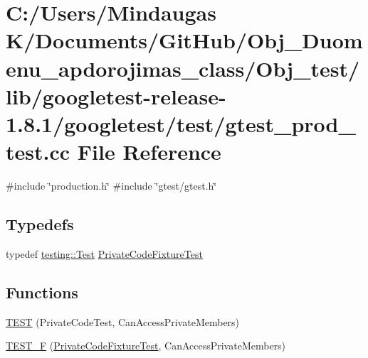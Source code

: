 \hypertarget{_obj__test_2lib_2googletest-release-1_88_81_2googletest_2test_2gtest__prod__test_8cc}{}\section{C\+:/\+Users/\+Mindaugas K/\+Documents/\+Git\+Hub/\+Obj\+\_\+\+Duomenu\+\_\+apdorojimas\+\_\+class/\+Obj\+\_\+test/lib/googletest-\/release-\/1.8.1/googletest/test/gtest\+\_\+prod\+\_\+test.cc File Reference}
\label{_obj__test_2lib_2googletest-release-1_88_81_2googletest_2test_2gtest__prod__test_8cc}
{\ttfamily \#include \char`\"{}production.\+h\char`\"{}}\newline
{\ttfamily \#include \char`\"{}gtest/gtest.\+h\char`\"{}}\newline
\subsection*{Typedefs}
\begin{DoxyCompactItemize}
\item 
typedef \mbox{\hyperlink{classtesting_1_1_test}{testing\+::\+Test}} \mbox{\hyperlink{_obj__test_2lib_2googletest-release-1_88_81_2googletest_2test_2gtest__prod__test_8cc_a89debba10c803e339ce0f9b0b34a2267}{Private\+Code\+Fixture\+Test}}
\end{DoxyCompactItemize}
\subsection*{Functions}
\begin{DoxyCompactItemize}
\item 
\mbox{\hyperlink{_obj__test_2lib_2googletest-release-1_88_81_2googletest_2test_2gtest__prod__test_8cc_a8e307a199011c2979d4a63464d245f4a}{T\+E\+ST}} (Private\+Code\+Test, Can\+Access\+Private\+Members)
\item 
\mbox{\hyperlink{_obj__test_2lib_2googletest-release-1_88_81_2googletest_2test_2gtest__prod__test_8cc_a5e21e7e8dd53f2de05e9e6941b6612d3}{T\+E\+S\+T\+\_\+F}} (\mbox{\hyperlink{googletest-master_2googletest_2test_2gtest__prod__test_8cc_a89debba10c803e339ce0f9b0b34a2267}{Private\+Code\+Fixture\+Test}}, Can\+Access\+Private\+Members)
\end{DoxyCompactItemize}


